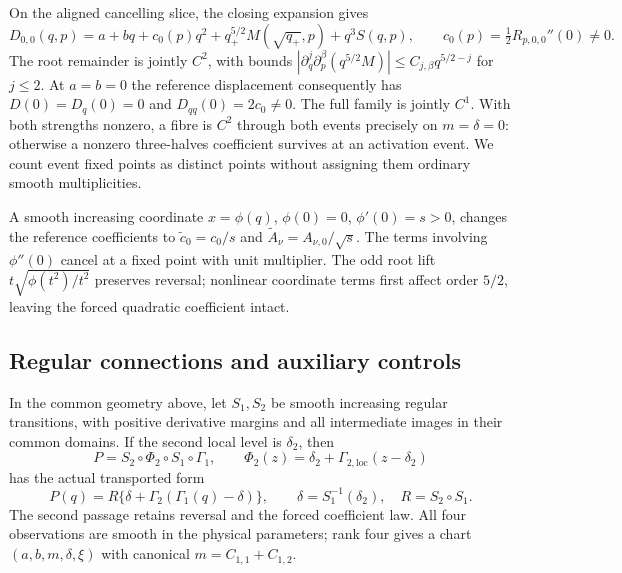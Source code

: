 On the aligned cancelling slice, the closing expansion gives
\begin{equation}\label{eq:center-displacement}
 D_{0,0}(q,p)=a+bq+c_0(p)q^2
       +q_+^{5/2}M(\sqrt{q_+},p)+q^3S(q,p),
 \qquad c_0(p)=\tfrac12R_{p,0,0}''(0)\ne0.
\end{equation}
The root remainder is jointly $C^2$, with bounds
$|\partial_q^j\partial_p^\beta(q^{5/2}M)|\le C_{j,\beta}q^{5/2-j}$
for $j\le2$. At $a=b=0$ the reference displacement consequently has
$D(0)=D_q(0)=0$ and $D_{qq}(0)=2c_0\ne0$.
The full family is jointly $C^1$. With both strengths nonzero, a fibre
is $C^2$ through both events precisely on $m=\delta=0$: otherwise a
nonzero three-halves coefficient survives at an activation event.
We count event fixed points as distinct points without assigning them
ordinary smooth multiplicities.

A smooth increasing coordinate $x=\phi(q)$, $\phi(0)=0$, $\phi'(0)=s>0$,
changes the reference coefficients to $\widetilde c_0=c_0/s$ and
$\widetilde A_\nu=A_{\nu,0}/\sqrt{s}$. The terms involving $\phi''(0)$
cancel at a fixed point with unit multiplier. The odd root lift
$t\sqrt{\phi(t^2)/t^2}$ preserves reversal; nonlinear coordinate terms
first affect order $5/2$, leaving the forced quadratic coefficient intact.

\subsection{Regular connections and auxiliary controls}

\begin{proposition}
\label{prop:field-recognition}\label{prop:passage:field-recognition}
In the common geometry above, let $S_1,S_2$ be smooth increasing regular
transitions, with positive derivative margins and all intermediate images
in their common domains. If the second local level is $\delta_2$, then
\begin{equation}\label{eq:passage:unreduced-return}
 P=S_2\circ\Phi_2\circ S_1\circ\Gamma_1,
 \qquad\Phi_2(z)=\delta_2+\Gamma_{2,\mathrm{loc}}(z-\delta_2)
\end{equation}
has the actual transported form
\begin{equation}\label{eq:passage:recognized-return}
 P(q)=R\{\delta+\Gamma_2(\Gamma_1(q)-\delta)\},
 \qquad\delta=S_1^{-1}(\delta_2),\quad R=S_2\circ S_1.
\end{equation}
The second passage retains reversal and the forced coefficient law.
All four observations are smooth in the physical parameters; rank four
gives a chart $(a,b,m,\delta,\xi)$ with canonical $m=C_{1,1}+C_{1,2}$.
\end{proposition}

